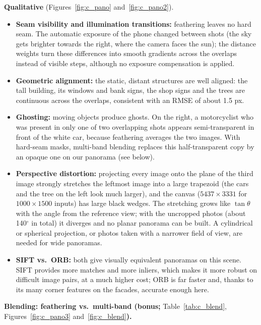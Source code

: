 \documentclass[a4paper,12pt]{article}
\begin{document}
\textbf{Qualitative} (Figures~\ref{fig:c_pano} and~\ref{fig:c_pano2}).
\begin{itemize}
    \item \textbf{Seam visibility and illumination transitions:} feathering leaves no hard seam. The automatic exposure of the phone changed between shots (the sky gets brighter towards the right, where the camera faces the sun); the distance weights turn these differences into smooth gradients across the overlaps instead of visible steps, although no exposure compensation is applied.
    \item \textbf{Geometric alignment:} the static, distant structures are well aligned: the tall building, its windows and bank signs, the shop signs and the trees are continuous across the overlaps, consistent with an RMSE of about 1.5 px.
    \item \textbf{Ghosting:} moving objects produce ghosts. On the right, a motorcyclist who was present in only one of two overlapping shots appears semi-transparent in front of the white car, because feathering averages the two images. With hard-seam masks, multi-band blending replaces this half-transparent copy by an opaque one on our panorama (see below).
    \item \textbf{Perspective distortion:} projecting every image onto the plane of the third image strongly stretches the leftmost image into a large trapezoid (the cars and the tree on the left look much larger), and the canvas ($5437\times3331$ for $1000\times1500$ inputs) has large black wedges. The stretching grows like $\tan\theta$ with the angle from the reference view; with the uncropped photos (about 140$^\circ$ in total) it diverges and no planar panorama can be built. A cylindrical or spherical projection, or photos taken with a narrower field of view, are needed for wide panoramas.
    \item \textbf{SIFT vs.\ ORB:} both give visually equivalent panoramas on this scene. SIFT provides more matches and more inliers, which makes it more robust on difficult image pairs, at a much higher cost; ORB is far faster and, thanks to its many corner features on the facades, accurate enough here.
\end{itemize}

\textbf{Blending: feathering vs.\ multi-band (bonus;} Table~\ref{tab:c_blend}, Figures~\ref{fig:c_pano3} and~\ref{fig:c_blend}\textbf{).}

\begin{table}[H]
\centering
\caption{Bonus: blending methods on the SIFT panorama. Seam gradient: lower = less visible seam; overlap sharpness: mean $|\nabla^2 I|$ on the overlaps (higher = less blur and ghosting).}
\label{tab:c_blend}
\setlength{\tabcolsep}{4pt}\resizebox{0.9\linewidth}{!}{}
\end{table}
\end{document}

